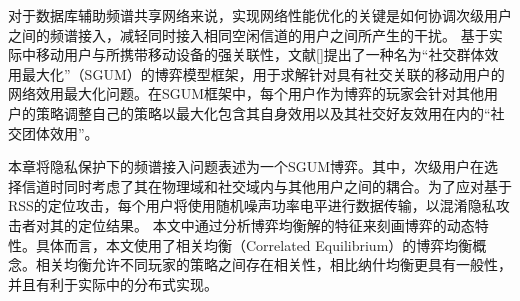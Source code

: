 对于数据库辅助频谱共享网络来说，实现网络性能优化的关键是如何协调次级用户之间的频谱接入，减轻同时接入相同空闲信道的用户之间所产生的干扰\cite{TII-game,TII-dynamic}。
基于实际中移动用户与所携带移动设备的强关联性，文献[]提出了一种名为“社交群体效用最大化”（SGUM）的博弈模型框架，用于求解针对具有社交关联的移动用户的网络效用最大化问题。在SGUM框架中，每个用户作为博弈的玩家会针对其他用户的策略调整自己的策略以最大化包含其自身效用以及其社交好友效用在内的“社交团体效用”。

本章将隐私保护下的频谱接入问题表述为一个SGUM博弈。其中，次级用户在选择信道时同时考虑了其在物理域和社交域内与其他用户之间的耦合。为了应对基于RSS的定位攻击，每个用户将使用随机噪声功率电平进行数据传输，以混淆隐私攻击者对其的定位结果。
本文中通过分析博弈均衡解的特征来刻画博弈的动态特性。具体而言，本文使用了相关均衡（Correlated Equilibrium）的博弈均衡概念\cite{Aumann}。相关均衡允许不同玩家的策略之间存在相关性，相比纳什均衡更具有一般性，并且有利于实际中的分布式实现\cite{Lasaulce2011}。


